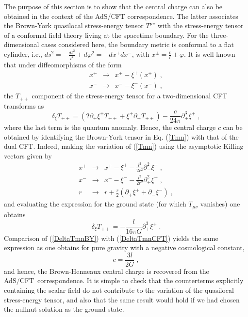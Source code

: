 \documentclass[a4paper,12pt]{article}
\begin{document}
The purpose of this section is to show that the central charge can also be
obtained in the context of the AdS/CFT correspondence.  The latter associates 
the Brown-York quasilocal stress-energy tensor $T^{\mu \nu }$
with the stress-energy tensor of a conformal field theory
living at the spacetime boundary. For the three-dimensional cases considered
here, the boundary metric is conformal to a flat cylinder, i.e., $%
ds^{2}=-\frac{dt^{2}}{l^{2}}+d\varphi ^{2}=-dx^{+}dx^{-}$, with $x^{\pm }=%
\frac{t}{l}\pm \varphi $. It is well known that under diffeomorphisms of the
form 
\begin{eqnarray*}
x^{+} &\rightarrow &x^{+}-\xi ^{+}(x^{+})\;, \\
x^{-} &\rightarrow &x^{-}-\xi ^{-}(x^{-})\;,
\end{eqnarray*}
the $T_{++}$ component of the stress-energy tensor for a two-dimensional CFT
transforms as 
\begin{equation}
\delta _{\xi }T_{++}=(2\partial _{+}\xi ^{+}T_{++}+\xi ^{+}\partial
_{+}T_{++})-\frac{c}{24\pi }\partial _{+}^{3}\xi ^{+}\;,  \label{DeltaTmnCFT}
\end{equation}
where the last term is the quantum anomaly. Hence, the central charge $c$
can be obtained by identifying the Brown-York tensor in Eq. (\ref{Tmn}) with
that of the dual CFT. Indeed, making the variation of (\ref{Tmn}) using the
asymptotic Killing vectors given by 
\begin{eqnarray*}
x^{+} &\rightarrow &x^{+}-\xi ^{+}-\frac{l^{2}}{2r^{2}}\partial _{-}^{2}\xi
^{-}\;, \\
x^{-} &\rightarrow &x^{-}-\xi ^{-}-\frac{l^{2}}{2r^{2}}\partial _{+}^{2}\xi
^{+}\;, \\
r &\rightarrow &r+\frac{r}{2}(\partial _{+}\xi ^{+}+\partial _{-}\xi ^{-})\;,
\end{eqnarray*}
and evaluating the expression for the ground state (for which $T_{\mu \nu }$
vanishes) one obtains 
\begin{equation}
\delta _{\xi }T_{++}=-\frac{l}{16\pi G}\partial _{+}^{3}\xi ^{+}\;.
\label{DeltaTmnBY}
\end{equation}
Comparison of (\ref{DeltaTmnBY}) with (\ref{DeltaTmnCFT}) yields the same
expression as one obtains for pure gravity with a negative cosmological constant, 
\[
c=\frac{3l}{2G}\;, 
\]
and hence, the Brown-Henneaux central charge is recovered from the AdS/CFT\
correspondence. It is simple to check that the counterterms explicitly containing
the scalar field do not contribute to the variation of the
quasilocal stress-energy tensor, and also that the same result would hold
if we had chosen the nullnut solution as the ground state.
\end{document}
